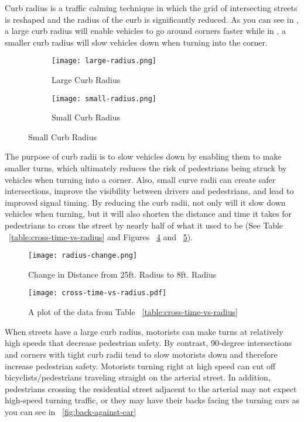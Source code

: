 Curb radius is a traffic calming technique in which the grid of intersecting streets is reshaped and the radius of the curb is significantly reduced. As you can see in , a large curb radius will enable vehicles to go around corners faster while in , a smaller curb radius will slow vehicles down when turning into the corner.

\begin{figure}[h]
\centering
\begin{subfigure}[b]{0.4\textwidth}
	\texttt{[image: large-radius.png]}
	\caption{Large Curb Radius}\label{fig:large-radius}
\end{subfigure}
\begin{subfigure}[b]{0.4\textwidth}
	\texttt{[image: small-radius.png]}
	\caption{Small Curb Radius}\label{fig:small-radius}
\end{subfigure}
\end{figure}

        The purpose of curb radii is to slow vehicles down by enabling them to make smaller turns, which ultimately reduces the risk of pedestrians being struck by vehicles when turning into a corner. Also, small curve radii can create safer intersections, improve the visibility between drivers and pedestrians, and lead to improved signal timing. By reducing the curb radii, not only will it slow down vehicles when turning, but it will also shorten the distance and time it takes for pedestrians to cross the street by nearly half of what it used to be (See Table ~\ref{table:cross-time-vs-radius} and Figures ~\ref{fig:radius-change} and ~\ref{fig:cross-time-vs-radius}).
        
\begin{figure}[h]
\centering
	\texttt{[image: radius-change.png]}
	\caption{Change in Distance from 25ft. Radius to 8ft. Radius}\label{fig:radius-change}
\end{figure}



\begin{figure}[h]
\centering
	\texttt{[image: cross-time-vs-radius.pdf]}
	\caption{A plot of the data from Table ~\ref{table:cross-time-vs-radius}}\label{fig:cross-time-vs-radius}
\end{figure}

        When streets have a large curb radius, motorists can make turns at relatively high speeds that decrease pedestrian safety. By contrast, 90-degree intersections and corners with tight curb radii tend to slow motorists down and therefore increase pedestrian safety. Motorists turning right at high speed can cut off bicyclists/pedestrians traveling straight on the arterial street. In addition, pedestrians crossing the residential street adjacent to the arterial may not expect high-speed turning traffic, or they may have their backs facing the turning cars as you can see in ~\ref{fig:back-against-car}

